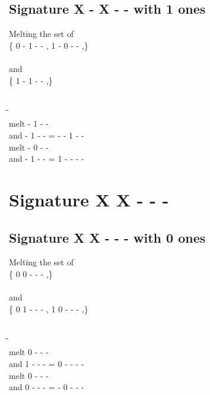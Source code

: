 \documentclass{article}
\begin{document}
\subsection{Signature X - X - - with 1 ones}
Melting the set of\\
\{ 0  -  1  -  - , 1  -  0  -  - ,\}\\\\
and\\
\{ 1  -  1  -  - ,\}\\\\
\begin{tabbing}
\hspace{3cm}\=\hspace{3cm}\=\hspace{3cm}\\[1cm]
melt  -  1  -  - \\
and  -  1  -  - \>
 =  -  -  1  -  - \\[1mm]
melt  -  0  -  - \\
and  -  1  -  - \>
 =  1  -  -  -  - \\[1mm]
\end{tabbing}
\newpage
\section{Signature X X - - - }
\subsection{Signature X X - - - with 0 ones}
Melting the set of\\
\{ 0  0  -  -  - ,\}\\\\
and\\
\{ 0  1  -  -  - , 1  0  -  -  - ,\}\\\\
\begin{tabbing}
\hspace{3cm}\=\hspace{3cm}\=\hspace{3cm}\\[1cm]
melt  0  -  -  - \\
and  1  -  -  - \>
 =  0  -  -  -  - \\[1mm]
melt  0  -  -  - \\
and  0  -  -  - \>
 =  -  0  -  -  - \\[1mm]
\end{tabbing}
\newpage
\end{document}
